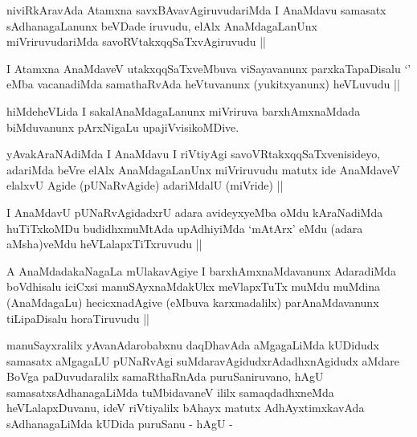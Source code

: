 \begin{artha}
niviRkAravAda Atamxna savxBAvavAgiruvudariMda I AnaMdavu samasatx
sAdhanagaLanunx beVDade iruvudu, elAlx AnaMdagaLanUnx miVriruvudariMda
savoRVtakxqqSaTxvAgiruvudu ||
\end{artha}


\begin{artha}
I Atamxna AnaMdaveV utakxqqSaTxveMbuva viSayavanunx parxkaTapaDisalu
`\stext' eMba vacanadiMda samathaRvAda heVtuvanunx (yukitxyanunx)
heVLuvudu ||
\end{artha}

\begin{artha}
hiMdeheVLida I sakalAnaMdagaLanunx miVriruva barxhAmxnaMdada
biMduvanunx pArxNigaLu upajiVvisikoMDive.
\end{artha}

\begin{artha}
yAvakAraNAdiMda I AnaMdavu I riVtiyAgi savoVRtakxqqSaTxvenisideyo,
adariMda beVre elAlx AnaMdagaLanUnx miVriruvudu matutx ide AnaMdaveV
elalxvU Agide (pUNaRvAgide) adariMdalU (miVride) ||
\end{artha}


\begin{artha}
I AnaMdavU pUNaRvAgidadxrU adara avideyxyeMba oMdu kAraNadiMda
huTiTxkoMDu budidhxmuMtAda upAdhiyiMda `mAtArx' eMdu (adara
aMsha)veMdu heVLalapxTiTxruvudu ||
\end{artha}



\begin{artha}
A AnaMdadakaNagaLa mUlakavAgiye I barxhAmxnaMdavanunx AdaradiMda
boVdhisalu iciCxsi manuSAyxnaMdakUkx meVlapxTuTx muMdu muMdina
(AnaMdagaLu) hecicxnadAgive (eMbuva karxmadalilx) parAnaMdavanunx
tiLipaDisalu horaTiruvudu || 
\end{artha}


\stext


\begin{artha}
manuSayxralilx yAvanAdarobabxnu daqDhavAda aMgagaLiMda kUDidudx
samasatx aMgagaLU pUNaRvAgi suMdaravAgidudxrAdadhxnAgidudx aMdare
BoVga paDuvudaralilx samaRthaRnAda puruSaniruvano, hAgU
samasatxsAdhanagaLiMda tuMbidavaneV ililx samaqdadhxneMda
heVLalapxDuvanu, ideV riVtiyalilx bAhayx matutx AdhAyxtimxkavAda
sAdhanagaLiMda kUDida puruSanu - hAgU -
\end{artha}

